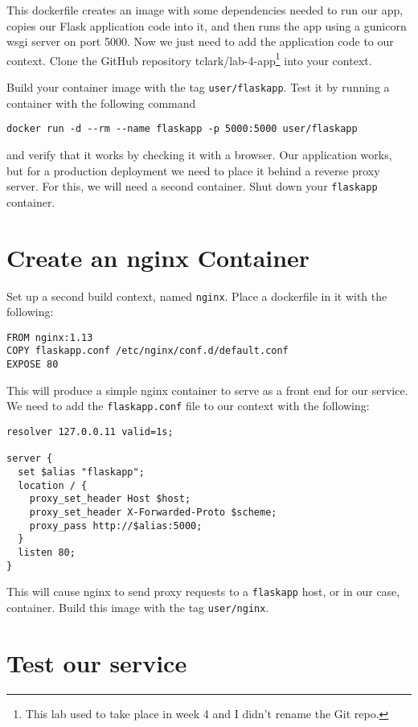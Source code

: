 \documentclass{article}
\begin{document}
This dockerfile creates an image with some dependencies needed to run our app, copies our Flask application code into it, and then runs the app using a gunicorn wsgi server on port 5000. Now we just need to add the application code to our context. Clone the GitHub repository tclark/lab-4-app\footnote{This lab used to take place in week 4 and I didn't rename the Git repo.} into your context.

Build your container image with the tag \texttt{user/flaskapp}. Test it by running a container with the following command

\begin{verbatim}
docker run -d --rm --name flaskapp -p 5000:5000 user/flaskapp
\end{verbatim}

and verify that it works by checking it with a browser.  Our application works, but for a production deployment we need to place it behind a reverse proxy server. For this, we will need a second container. Shut down your \texttt{flaskapp} container.

\section{Create an nginx Container}
Set up a second build context, named \texttt{nginx}. Place a dockerfile in it with the following:

\begin{verbatim}
FROM nginx:1.13
COPY flaskapp.conf /etc/nginx/conf.d/default.conf
EXPOSE 80
\end{verbatim}

This will produce a simple nginx container to serve as a front end for our service. We need to add the \texttt{flaskapp.conf} file to our context with the following:

\begin{verbatim}
resolver 127.0.0.11 valid=1s;

server {  
  set $alias "flaskapp";
  location / {
    proxy_set_header Host $host;
    proxy_set_header X-Forwarded-Proto $scheme;
    proxy_pass http://$alias:5000;
  }
  listen 80;
}
\end{verbatim}

This will cause nginx to send proxy requests to a \texttt{flaskapp} host, or in our case, container. Build this image with the tag \texttt{user/nginx}.

\section{Test our service}
\end{document}
